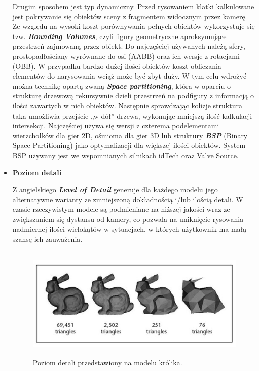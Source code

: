 \begin{itemize}
	Drugim sposobem jest typ dynamiczny. Przed rysowaniem klatki kalkulowane jest pokrywanie się obiektów sceny z fragmentem widocznym przez kamerę. Ze względu na wysoki koszt porównywania pełnych obiektów wykorzystuje się tzw. \emph{\textbf{Bounding Volumes}}, czyli figury geometryczne aproksymujące przestrzeń zajmowaną przez obiekt. Do najczęściej używanych należą sfery, prostopadłościany wyrównane do osi (AABB) oraz ich wersje z rotacjami (OBB).
	W przypadku bardzo dużej ilości obiektów koszt obliczania elementów do narysowania wciąż może być zbyt duży. W tym celu wdrożyć można technikę opartą zwaną \emph{\textbf{Space partitioning}}, która w oparciu o strukturę drzewową rekursywnie dzieli przestrzeń na podfigury z informacją o ilości zawartych w nich obiektów. Następnie sprawdzając kolizje struktura taka umożliwia przejście „w dół'' drzewa, wykonując mniejszą ilość kalkulacji intersekcji. Najczęściej używa się wersji z czterema podelementami wierzchołków dla gier 2D, ośmioma dla gier 3D lub struktury \emph{\textbf{BSP}} (Binary Space Partitioning) jako optymalizacji dla większej ilości obiektów. System BSP używany jest we wspomnianych silnikach idTech oraz Valve Source.
	
	\item \textbf{Poziom detali}
	
	Z angielskiego \emph{\textbf{Level of Detail}} generuje dla każdego modelu jego alternatywne warianty ze zmniejszoną dokładnością i/lub ilością detali. W czasie rzeczywistym modele są podmieniane na niższej jakości wraz ze zwiększaniem się dystansu od kamery, co pozwala na uniknięcie rysowania nadmiernej ilości wielokątów w sytuacjach, w których użytkownik ma małą szansę ich zauważenia.
	
	\begin{figure}[htbp]
		\centering
		\includegraphics[width=4.975in,height=2.13971in]{images/13_LOD_rabbit.jpg}
		\caption{Poziom detali przedstawiony na modelu królika. \cite{3dstudio:lod:2024}}
	\end{figure}
\end{itemize}

